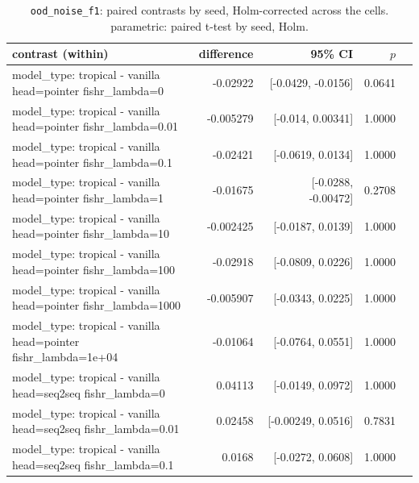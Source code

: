 \documentclass[10pt]{article}
\makeatletter
\newcommand{\stackcell}[1]{\begin{tabular}[t]{@{}l@{}}#1\end{tabular}}
\makeatother
\begin{document}
{\small
\begin{longtable}{lrrrl}
\caption{\texttt{ood\_noise\_f1}: paired contrasts by seed, Holm-corrected across the cells. parametric: paired t-test by seed, Holm.}\label{tab:paired-ood_noise_f1}\\
\toprule
contrast (within) & difference & 95\% CI & $p$ & \\
\midrule
\endhead
\stackcell{model\_type: tropical - vanilla\\\footnotesize head=pointer fishr\_lambda=0 } & -0.02922 & [-0.0429, -0.0156] & 0.0641 & \\
\stackcell{model\_type: tropical - vanilla\\\footnotesize head=pointer fishr\_lambda=0.01 } & -0.005279 & [-0.014, 0.00341] & 1.0000 & \\
\stackcell{model\_type: tropical - vanilla\\\footnotesize head=pointer fishr\_lambda=0.1 } & -0.02421 & [-0.0619, 0.0134] & 1.0000 & \\
\stackcell{model\_type: tropical - vanilla\\\footnotesize head=pointer fishr\_lambda=1 } & -0.01675 & [-0.0288, -0.00472] & 0.2708 & \\
\stackcell{model\_type: tropical - vanilla\\\footnotesize head=pointer fishr\_lambda=10 } & -0.002425 & [-0.0187, 0.0139] & 1.0000 & \\
\stackcell{model\_type: tropical - vanilla\\\footnotesize head=pointer fishr\_lambda=100 } & -0.02918 & [-0.0809, 0.0226] & 1.0000 & \\
\stackcell{model\_type: tropical - vanilla\\\footnotesize head=pointer fishr\_lambda=1000 } & -0.005907 & [-0.0343, 0.0225] & 1.0000 & \\
\stackcell{model\_type: tropical - vanilla\\\footnotesize head=pointer fishr\_lambda=1e+04 } & -0.01064 & [-0.0764, 0.0551] & 1.0000 & \\
\stackcell{model\_type: tropical - vanilla\\\footnotesize head=seq2seq fishr\_lambda=0 } & 0.04113 & [-0.0149, 0.0972] & 1.0000 & \\
\stackcell{model\_type: tropical - vanilla\\\footnotesize head=seq2seq fishr\_lambda=0.01 } & 0.02458 & [-0.00249, 0.0516] & 0.7831 & \\
\stackcell{model\_type: tropical - vanilla\\\footnotesize head=seq2seq fishr\_lambda=0.1 } & 0.0168 & [-0.0272, 0.0608] & 1.0000 & \\

\end{longtable}}
\end{document}
